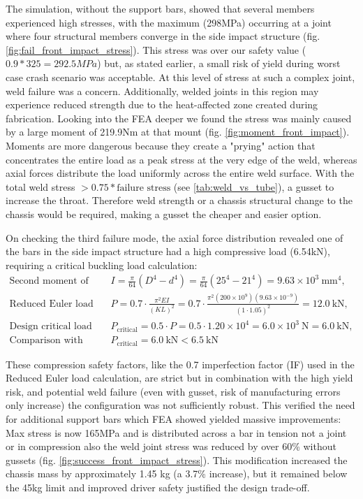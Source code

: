 \documentclass[11pt, a4paper]{report}
\numberwithin{equation}{section}
\begin{document}
\begin{refsection}
The simulation, without the support bars, showed that several members experienced high stresses, with the maximum (298MPa) occurring at a joint where four structural members converge in the side impact structure (fig. \ref{fig:fail_front_impact_stress}). This stress was over our safety value ($0.9*325=292.5MPa$) but, as stated earlier, a small risk of yield during worst case crash scenario was acceptable. At this level of stress at such a complex joint, weld failure was a concern. Additionally, welded joints in this region may experience reduced strength due to the heat-affected zone created during fabrication. Looking into the FEA deeper we found the stress was mainly caused by a large moment of 219.9Nm at that mount (fig. \ref{fig:moment_front_impact}). Moments are more dangerous because they create a "prying" action that concentrates the entire load as a peak stress at the very edge of the weld, whereas axial forces distribute the load uniformly across the entire weld surface. With the total weld stress $>0.75* \text{failure stress}$ (see \ref{tab:weld_vs_tube}), a gusset to increase the throat. Therefore weld strength or a chassis structural change to the chassis would be required, making a gusset the cheaper and easier option.

On checking the third failure mode, the axial force distribution revealed one of the bars in the side impact structure had a high compressive load (6.54kN), requiring a critical buckling load calculation:
\vspace{-5pt}
\begin{align*}
\text{Second moment of area: } & I = \frac{\pi}{64}(D^4-d^4) = \frac{\pi}{64}(25^4-21^4) = 9.63 \times 10^{3}~\text{mm}^4, \\
\text{Reduced Euler load (IF 0.7): } & P = 0.7 \cdot \frac{\pi^2 E I}{(K L)^2} = 0.7 \cdot \frac{\pi^2 (200 \times 10^9)(9.63\times10^{-9})}{(1 \cdot 1.05)^2} = 12.0~\text{kN}, \\
\text{Design critical load (Safety Factor 0.5): } & P_{\text{critical}} = 0.5 \cdot P = 0.5 \cdot 1.20 \times 10^{4} = 6.0 \times 10^{3}~\text{N} = 6.0~\text{kN}, \\
\text{Comparison with applied load: } & P_{\text{critical}} = 6.0~\text{kN} < 6.5~\text{kN}
\end{align*}

These compression safety factors, like the 0.7 imperfection factor (IF) used in the Reduced Euler load calculation, are strict but in combination with the high yield risk, and potential weld failure (even with gusset, risk of manufacturing errors only increase) the configuration was not sufficiently robust. This verified the need for additional support bars which FEA showed yielded massive improvements: Max stress is now 165MPa and is distributed across a bar in tension not a joint or in compression also the weld joint stress was reduced by over 60\% without gussets (fig. \ref{fig:success_front_impact_stress}). This modification increased the chassis mass by approximately 1.45 kg (a 3.7\% increase), but it remained below the 45kg limit and improved driver safety justified the design trade-off.


\end{refsection}
\end{document}
